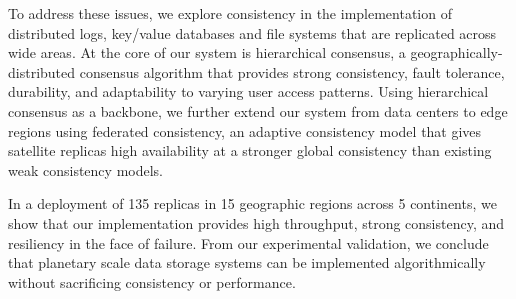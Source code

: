 To address these issues, we explore consistency in the implementation of distributed logs, key/value databases and file systems that are replicated across wide areas. At the core of our system is hierarchical consensus, a geographically-distributed consensus algorithm that provides strong consistency, fault tolerance, durability, and adaptability to varying user access patterns. Using hierarchical consensus as a backbone, we further extend our system from data centers to edge regions using federated consistency, an adaptive consistency model that gives satellite replicas high availability at a stronger global consistency than existing weak consistency models.

In a deployment of 135 replicas in 15 geographic regions across 5 continents, we show that our implementation provides high throughput, strong consistency, and resiliency in the face of failure. From our experimental validation, we conclude that planetary scale data storage systems can be implemented algorithmically without sacrificing consistency or performance. 
